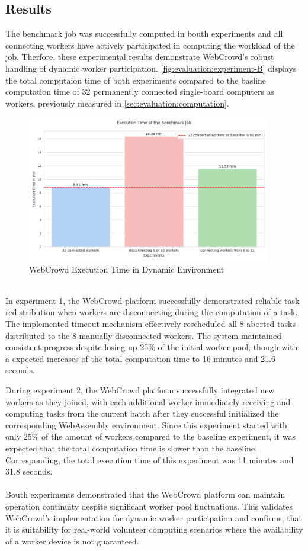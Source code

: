 \subsection{Results}
The benchmark job was successfully computed in bouth experiments and all connecting workers have actively participated in computing the workload of the job. Therfore, these experimental results demonstrate WebCrowd's robust handling of dynamic worker participation. \autoref{fig:evaluation:experiment-B} displays the total computaion time of both experiments compared to the basline computation time of 32 permanently connected single-board computers as workers, previously measured in \autoref{sec:evaluation:computation}.
\begin{figure}[htbp]
    \centering
    \includegraphics[width=0.95\textwidth]{gfx/figures/Evaluation_B.png}
    \caption{WebCrowd Execution Time in Dynamic Environment}
    \label{fig:evaluation:experiment-B}
\end{figure}
~\\
In experiment 1, the WebCrowd platform successfully demonstrated reliable task redistribution when workers are disconnecting during the computation of a task. The implemented timeout mechanism effectively rescheduled all 8 aborted tasks distributed to the 8 manually disconnected workers. The system maintained consistent progress despite losing up 25\% of the initial worker pool, though with a expected increases of the total computation time to 16 minutes and 21.6 seconds.

During experiment 2, the WebCrowd platform successfully integrated new workers as they joined, with each additional worker immediately receiving and computing tasks from the current batch after they successful initialized the corresponding WebAssembly environment. Since this experiment started with only 25\% of the amount of workers compared to the baseline experiment, it was expected that the total computation time is slower than the baseline. Corresponding, the total execution time of this experiment was 11 minutes and 31.8 seconds. 
\\~\\
Bouth experiments demonstrated that the WebCrowd platform can maintain operation continuity despite significant worker pool fluctuations. This validates WebCrowd's implementation for dynamic worker participation and confirms, that it is suitability for real-world volunteer computing scenarios where the availability of a worker device is not guaranteed.

